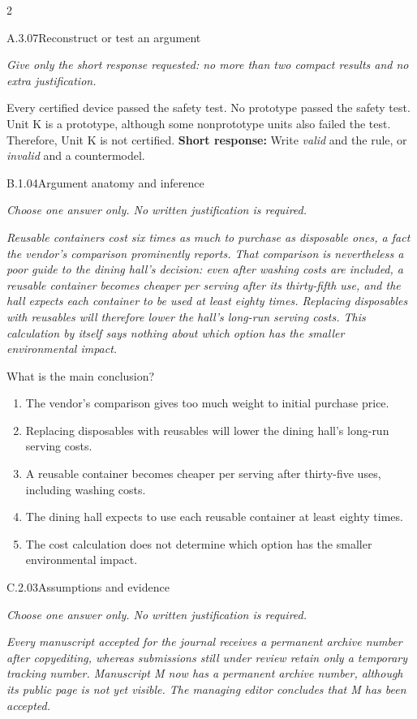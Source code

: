 \documentclass[9pt]{extarticle}
\newcommand{\choice}[1]{\item #1}
\begin{document}
\begin{multicols}{2}
\begin{DenseCoreProblem}{A.3.07}{Reconstruct or test an argument}
{\scriptsize\textit{Give only the short response requested: no more than two compact results and no extra justification.}\par}
Every certified device passed the safety test. No prototype passed the safety test. Unit K is a prototype, although some nonprototype units also failed the test. Therefore, Unit K is not certified.
\textbf{Short response:} Write \emph{valid} and the rule, or \emph{invalid} and a countermodel.
\end{DenseCoreProblem}
\begin{DenseCoreProblem}{B.1.04}{Argument anatomy and inference}
{\scriptsize\textit{Choose one answer only. No written justification is required.}\par}
\emph{Reusable containers cost six times as much to purchase as disposable ones, a fact the vendor's comparison prominently reports. That comparison is nevertheless a poor guide to the dining hall's decision: even after washing costs are included, a reusable container becomes cheaper per serving after its thirty-fifth use, and the hall expects each container to be used at least eighty times. Replacing disposables with reusables will therefore lower the hall's long-run serving costs. This calculation by itself says nothing about which option has the smaller environmental impact.}

What is the main conclusion?
\begin{enumerate}[label=(\alph*)]
  \choice{The vendor's comparison gives too much weight to initial purchase price.}
  \choice{Replacing disposables with reusables will lower the dining hall's long-run serving costs.}
  \choice{A reusable container becomes cheaper per serving after thirty-five uses, including washing costs.}
  \choice{The dining hall expects to use each reusable container at least eighty times.}
  \choice{The cost calculation does not determine which option has the smaller environmental impact.}
\end{enumerate}
\end{DenseCoreProblem}
\columnbreak
\begin{DenseCoreProblem}{C.2.03}{Assumptions and evidence}
{\scriptsize\textit{Choose one answer only. No written justification is required.}\par}
\emph{Every manuscript accepted for the journal receives a permanent archive number after copyediting, whereas submissions still under review retain only a temporary tracking number. Manuscript M now has a permanent archive number, although its public page is not yet visible. The managing editor concludes that M has been accepted.}


\end{DenseCoreProblem}
\end{multicols}
\end{document}
